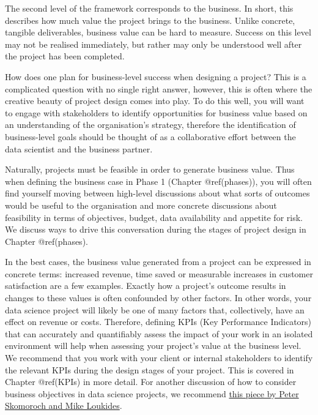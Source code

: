 \documentclass[
]{book}
\begin{document}
The second level of the framework corresponds to the business. In short,
this describes how much value the project brings to the business. Unlike
concrete, tangible deliverables, business value can be hard to measure.
Success on this level may not be realised immediately, but rather may
only be understood well after the project has been completed.

How does one plan for business-level success when designing a project?
This is a complicated question with no single right answer, however,
this is often where the creative beauty of project design comes into
play. To do this well, you will want to engage with stakeholders to
identify opportunities for business value based on an understanding of
the organisation's strategy, therefore the identification of
business-level goals should be thought of as a collaborative effort
between the data scientist and the business partner.

Naturally, projects must be feasible in order to generate business
value. Thus when defining the business case in Phase 1 (Chapter
@ref(phases)), you will often find yourself moving between high-level
discussions about what sorts of outcomes would be useful to the
organisation and more concrete discussions about feasibility in terms of
objectives, budget, data availability and appetite for risk. We discuss
ways to drive this conversation during the stages of project design in
Chapter @ref(phases).

In the best cases, the business value generated from a project can be
expressed in concrete terms: increased revenue, time saved or measurable
increases in customer satisfaction are a few examples. Exactly how a
project's outcome results in changes to these values is often confounded
by other factors. In other words, your data science project will likely
be one of many factors that, collectively, have an effect on revenue or
costs. Therefore, defining KPIs (Key Performance Indicators) that can
accurately and quantifiably assess the impact of your work in an
isolated environment will help when assessing your project's value at
the business level. We recommend that you work with your client or
internal stakeholders to identify the relevant KPIs during the design
stages of your project. This is covered in Chapter @ref(KPIs) in more
detail. For another discussion of how to consider business objectives in
data science projects, we recommend
\href{https://www.oreilly.com/radar/what-you-need-to-know-about-product-management-for-ai/}{this
piece by Peter Skomoroch and Mike Loukides}.
\end{document}
